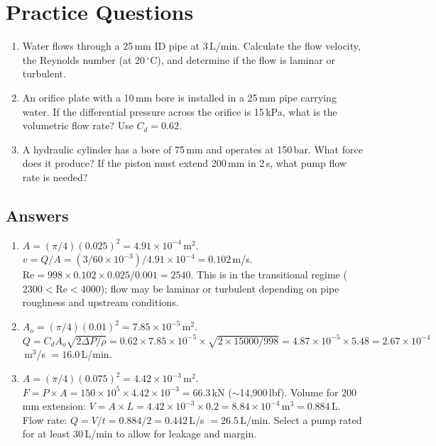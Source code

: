 \documentclass[11pt,letterpaper,twoside,openany]{book}
\newcommand{\degC}{\ensuremath{{}^{\circ}\text{C}}}
\begin{document}
\section{Practice Questions}
\begin{enumerate}[leftmargin=1.5em]
\item Water flows through a 25\,mm ID pipe at 3\,L/min. Calculate the flow velocity, the Reynolds number (at 20\,\degC{}), and determine if the flow is laminar or turbulent.
\item An orifice plate with a 10\,mm bore is installed in a 25\,mm pipe carrying water. If the differential pressure across the orifice is 15\,kPa, what is the volumetric flow rate? Use $C_d = 0.62$.
\item A hydraulic cylinder has a bore of 75\,mm and operates at 150\,bar. What force does it produce? If the piston must extend 200\,mm in 2\,s, what pump flow rate is needed?
\end{enumerate}

\subsection{Answers}
\begin{enumerate}[leftmargin=1.5em]
\item $A = (\pi/4)(0.025)^2 = 4.91 \times 10^{-4}$\,m$^2$. $v = Q/A = (3/60 \times 10^{-3})/4.91 \times 10^{-4} = 0.102$\,m/s. $\text{Re} = 998 \times 0.102 \times 0.025/0.001 = 2540$. This is in the transitional regime ($2300 < \text{Re} < 4000$); flow may be laminar or turbulent depending on pipe roughness and upstream conditions.
\item $A_o = (\pi/4)(0.01)^2 = 7.85 \times 10^{-5}$\,m$^2$. $Q = C_d A_o \sqrt{2\Delta P/\rho} = 0.62 \times 7.85 \times 10^{-5} \times \sqrt{2 \times 15000/998} = 4.87 \times 10^{-5} \times 5.48 = 2.67 \times 10^{-4}$\,m$^3$/s $= 16.0$\,L/min.
\item $A = (\pi/4)(0.075)^2 = 4.42 \times 10^{-3}$\,m$^2$. $F = P \times A = 150 \times 10^5 \times 4.42 \times 10^{-3} = 66.3$\,kN ($\sim$14{,}900\,lbf). Volume for 200\,mm extension: $V = A \times L = 4.42 \times 10^{-3} \times 0.2 = 8.84 \times 10^{-4}$\,m$^3 = 0.884$\,L. Flow rate: $Q = V/t = 0.884/2 = 0.442$\,L/s $= 26.5$\,L/min. Select a pump rated for at least 30\,L/min to allow for leakage and margin.
\end{enumerate}


\end{document}
